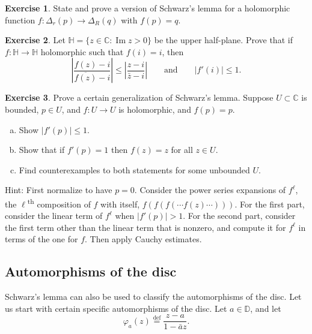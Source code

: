 \documentclass[12pt,openany]{book}
\renewcommand{\Im}{\operatorname{Im}}
\newcommand{\abs}[1]{\left\lvert {#1} \right\rvert}
\newcommand{\C}{{\mathbb{C}}}
\newcommand{\D}{{\mathbb{D}}}
\newcommand{\bH}{{\mathbb{H}}}
\theoremstyle{plain}
\theoremstyle{remark}
\theoremstyle{definition}
\newenvironment{exbox}{%
    \def\FrameCommand{\vrule width 1pt \relax\hspace{10pt}}%
    \MakeFramed{\advance\hsize-\width\FrameRestore}%
}{%
    \endMakeFramed
}
\newenvironment{exparts}{%
    \leavevmode\begin{enumerate}[a),noitemsep,topsep=0pt,parsep=0pt,partopsep=0pt]
}{%
    \end{enumerate}
}
\theoremstyle{exercise}
\newtheorem{exercise}{Exercise}[section]
\theoremstyle{example}
\begin{document}
\begin{exbox}
\begin{exercise}
State and prove a version of Schwarz's lemma for a holomorphic
function $f \colon \Delta_r(p) \to \Delta_R(q)$ with $f(p)=q$.
\end{exercise}

\begin{exercise}
Let $\bH = \{ z \in \C : \Im z > 0 \}$ be the upper half-plane.
Prove that if $f \colon \bH \to \bH$ holomorphic such that $f(i) = i$, then
\begin{equation*}
\abs{\frac{f(z)-i}{\overline{f(z)}-i}} \leq
\abs{\frac{z-i}{\bar{z}-i}} 
\qquad
\text{and}
\qquad
\abs{f'(i)} \leq 1 .
\end{equation*}
\end{exercise}

\begin{exercise}
Prove a certain generalization of Schwarz's lemma.  Suppose $U \subset \C$
is bounded, $p \in U$, and $f \colon U \to U$ is holomorphic, and $f(p)=p$.
\begin{exparts}
\item
Show $\abs{f'(p)} \leq 1$.
\item
Show that if $f'(p) = 1$ then $f(z) = z$ for all $z \in U$.
\item
Find counterexamples to both statements for some unbounded $U$.
\end{exparts}
Hint: First normalize to have $p=0$.  Consider the power series
expansions of
$f^{\ell}$, the $\ell$\textsuperscript{th} composition of $f$ with itself,
$f(f(f(\cdots f(z) \cdots)))$.
For the first part, consider the linear term of $f^{\ell}$ when $\abs{f'(p)}
> 1$.  For the second part,
consider the first term other
than the linear term that is nonzero, and compute it for $f^{\ell}$ in terms
of the one for $f$.  Then apply Cauchy estimates.
\end{exercise}
\end{exbox}

\subsection{Automorphisms of the disc}

Schwarz's lemma can also be used to classify the automorphisms of the disc.
Let us start with certain specific automorphisms of the disc.
Let $a \in \D$, and let
\begin{equation*}
\varphi_a(z) \overset{\text{def}}{=} \frac{z-a}{1-\bar{a}z}.
\end{equation*}
\end{document}
